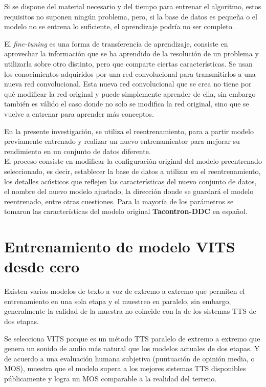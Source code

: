 Si se dispone del material necesario y del tiempo para entrenar el algoritmo, estos requisitos no suponen ningún problema, pero, si la base de datos es pequeña o el modelo no se entrena lo suficiente, el aprendizaje podría no ser completo.

El \textit{fine-tuning} es una forma de transferencia de aprendizaje, consiste en aprovechar la información que se ha aprendido de
la resolución de un problema y utilizarla sobre otro distinto, pero que comparte ciertas características. Se usan los conocimientos adquiridos por una red convolucional para transmitirlos a una nueva red convolucional. Esta nueva red convolucional que se crea no tiene por qué modificar la red original y puede simplemente aprender de ella, sin embargo también es válido el caso donde no solo se modifica la red original, sino que se vuelve a entrenar para aprender más conceptos.
  
En la presente investigación, se utiliza el reentrenamiento, para a partir modelo previamente entrenado y realizar un nuevo entrenamientor para mejorar su rendimiento en un conjunto de datos diferente.\\

El proceso consiste en modificar la configuración original del modelo preentrenado seleccionado, es decir, establecer la base de datos a utilizar en el reentrenamiento, los detalles acústicos que reflejen las características del nuevo conjunto de datos, el nombre del nuevo modelo ajustado, la dirección donde se guardará el modelo reentrenado, entre otras cuestiones. Para la mayoría de los parámetros se tomaron las características del modelo original \textbf{Tacontron-DDC} en español.



\section{Entrenamiento de modelo VITS desde cero}

Existen varios modelos de texto a voz de extremo a extremo que permiten el entrenamiento en una sola etapa y el muestreo en paralelo, sin embargo, generalmente la calidad de la muestra no coincide con la de los sistemas TTS de dos etapas. 

Se selecciona VITS porque es un método TTS paralelo de extremo a extremo que genera un sonido de audio más natural que los modelos actuales de dos etapas. Y de acuerdo a una evaluación humana subjetiva (puntuación de opinión media, o MOS), muestra que el modelo supera a los mejores sistemas TTS disponibles públicamente y logra un MOS comparable a la realidad del terreno.

